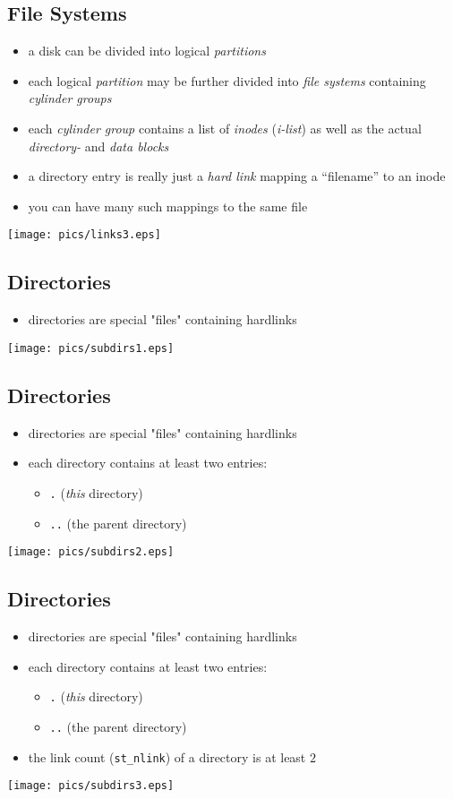 \documentclass[xga]{xdvislides}
\begin{document}
\subsection{File Systems}
\begin{itemize}
	\item a disk can be divided into logical {\em partitions}
	\item each logical {\em partition} may be further divided into
		{\em file systems} containing {\em cylinder groups}
	\item each {\em cylinder group} contains a list of {\em inodes} ({\em i-list})
		as well as the actual {\em directory-} and {\em data blocks}
	\item a directory entry is really just a {\em hard link} mapping a
		``filename'' to an inode
	\item you can have many such mappings to the same file
\end{itemize}
\texttt{[image: pics/links3.eps]}

\subsection{Directories}
\begin{itemize}
	\item directories are special "files" containing hardlinks
\end{itemize}
\texttt{[image: pics/subdirs1.eps]}

\subsection{Directories}
\begin{itemize}
	\item directories are special "files" containing hardlinks
	\item each directory contains at least two entries:
		\begin{itemize}
			\item {\tt .} ({\em this} directory)
			\item {\tt ..} (the parent directory)
		\end{itemize}
\end{itemize}
\texttt{[image: pics/subdirs2.eps]}

\subsection{Directories}
\begin{itemize}
	\item directories are special "files" containing hardlinks
	\item each directory contains at least two entries:
		\begin{itemize}
			\item {\tt .} ({\em this} directory)
			\item {\tt ..} (the parent directory)
		\end{itemize}
	\item the link count ({\tt st\_nlink}) of a directory is at least $2$
\end{itemize}
\texttt{[image: pics/subdirs3.eps]}
\end{document}
